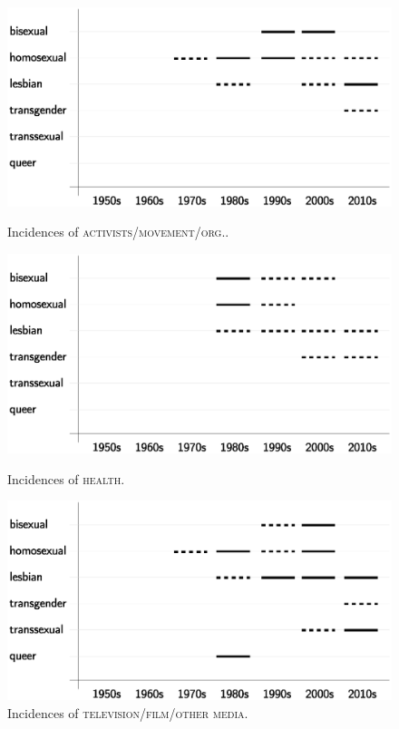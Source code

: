 \documentclass[10pt,a4paper,twocolumn]{scrartcl}
\begin{document}
\begin{figure}
\begin{minipage}{0.48\textwidth}
\includegraphics[width=\columnwidth]{figures/topic_activists}
\caption{Incidences of \textsc{activists/movement/org.}.} \label{fig:topic_activ}

\includegraphics[width=\columnwidth]{figures/topic_health}
\caption{Incidences of \textsc{health}.} \label{fig:topic_health}

\includegraphics[width=\columnwidth]{figures/topic_tv}
\caption{Incidences of \textsc{television/film/other media}.} \label{fig:topic_tv}


\end{minipage}
\end{figure}
\end{document}
